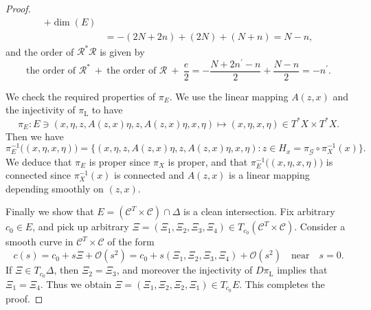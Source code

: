 \documentclass[a4paper,11pt,reqno]{amsart}
\theoremstyle{definition}
\theoremstyle{remark}
\begin{document}
\begin{proof}
\begin{align*}
  +
  \operatorname{dim}(E)
\\
& =
  -(2N+2n)+(2N)+(N+n)
  =
  N-n, 
\end{align*}
%
%
and the order of $\mathcal{R}^\ast\mathcal{R}$ is given by 
%
%
$$
\text{the order of $\mathcal{R}^\ast$}\ 
+\ 
\text{the order of $\mathcal{R}$}\ 
+\
\frac{e}{2}
=
-\frac{N+2n^\prime-n}{2}+\frac{N-n}{2}
=
-n^\prime. 
$$
%
%
\par
%
%
We check the required properties of $\pi_E$. 
We use the linear mapping $A(z,x)$ and the injectivity of $\pi_\text{L}$ to have 
%
%
$$
\pi_E: 
E 
\ni
(x,\eta,z,A(z,x)\eta,z,A(z,x)\eta,x,\eta)
\mapsto 
(x,\eta,x,\eta)
\in 
T^\ast{X}{\times}T^\ast{X}. 
$$
%
% 
Then we have 
%
%
$$
\pi_E^{-1}\bigl((x,\eta,x,\eta)\bigr)
=
\{
(x,\eta,z,A(z,x)\eta,z,A(z,x)\eta,x,\eta) 
: 
z \in H_x=\pi_\mathcal{G}\circ\pi_X^{-1}(x)
\}. 
$$
%
%
We deduce that $\pi_E$ is proper since $\pi_X$ is proper, 
and that $\pi_E^{-1}\bigl((x,\eta,x,\eta)\bigr)$ is connected 
since $\pi_X^{-1}(x)$ is connected and $A(z,x)$ is a linear mapping depending smoothly on $(z,x)$. 
%
%
\par
%
%
Finally we show that $E=(\mathcal{C}^T\times\mathcal{C})\cap\Delta$ is a clean intersection. 
Fix arbitrary $c_0 \in E$, and pick up arbitrary 
$\Xi=(\Xi_1,\Xi_2,\Xi_3,\Xi_4) \in T_{c_0}(\mathcal{C}^T\times\mathcal{C})$. 
Consider a smooth curve in $\mathcal{C}^T\times\mathcal{C}$ of the form 
%
%
$$
c(s)
=
c_0+s\Xi+\mathcal{O}(s^2)
=
c_0
+
s(\Xi_1,\Xi_2,\Xi_3,\Xi_4)
+
\mathcal{O}(s^2)
\quad\text{near}\quad
s=0.
$$
%
%
If $\Xi \in T_{c_0}\Delta$, then $\Xi_2=\Xi_3$, 
and moreover the injectivity of $D\pi_\text{L}$ implies that $\Xi_1=\Xi_4$. 
Thus we obtain $\Xi=(\Xi_1,\Xi_2,\Xi_2,\Xi_1) \in T_{c_0}E$. 
This completes the proof. 
\end{proof}
%
%
\end{document}
